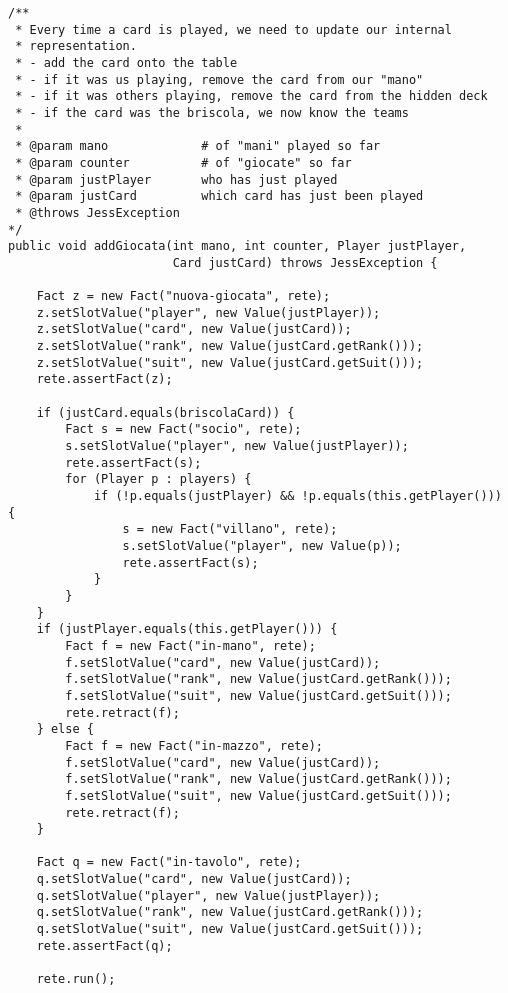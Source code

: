 \lstset{numbers=left, numberstyle=\tiny, stepnumber=1,firstnumber=1,
  numbersep=5pt,language=Java,
stringstyle=\ttfamily,
basicstyle=\footnotesize, 
showstringspaces=false,
breaklines=true
}

\begin{lstlisting}[caption={Funzione che viene richiamata ogni volta che si riceve la comunicazione di una nuova giocata (quindi anche la propria). Vengono aggiornati i fatti riguardanti la giocata stessa, la situazione in tavola e nel mazzo (ovvero nelle mani altrui) ed eventualmente i ruoli}, label=addGiocata]
/**
 * Every time a card is played, we need to update our internal
 * representation.
 * - add the card onto the table
 * - if it was us playing, remove the card from our "mano"
 * - if it was others playing, remove the card from the hidden deck
 * - if the card was the briscola, we now know the teams
 *
 * @param mano             # of "mani" played so far
 * @param counter          # of "giocate" so far
 * @param justPlayer       who has just played
 * @param justCard         which card has just been played
 * @throws JessException   
*/
public void addGiocata(int mano, int counter, Player justPlayer,
                       Card justCard) throws JessException {

    Fact z = new Fact("nuova-giocata", rete);
    z.setSlotValue("player", new Value(justPlayer));
    z.setSlotValue("card", new Value(justCard));
    z.setSlotValue("rank", new Value(justCard.getRank()));
    z.setSlotValue("suit", new Value(justCard.getSuit()));
    rete.assertFact(z);

    if (justCard.equals(briscolaCard)) {
        Fact s = new Fact("socio", rete);
        s.setSlotValue("player", new Value(justPlayer));
        rete.assertFact(s);
        for (Player p : players) {
            if (!p.equals(justPlayer) && !p.equals(this.getPlayer())) {
                s = new Fact("villano", rete);
                s.setSlotValue("player", new Value(p));
                rete.assertFact(s);
            }
        }
    }
    if (justPlayer.equals(this.getPlayer())) {
        Fact f = new Fact("in-mano", rete);
        f.setSlotValue("card", new Value(justCard));
        f.setSlotValue("rank", new Value(justCard.getRank()));
        f.setSlotValue("suit", new Value(justCard.getSuit()));
        rete.retract(f);
    } else {
        Fact f = new Fact("in-mazzo", rete);
        f.setSlotValue("card", new Value(justCard));
        f.setSlotValue("rank", new Value(justCard.getRank()));
        f.setSlotValue("suit", new Value(justCard.getSuit()));
        rete.retract(f);
    }

    Fact q = new Fact("in-tavolo", rete);
    q.setSlotValue("card", new Value(justCard));
    q.setSlotValue("player", new Value(justPlayer));
    q.setSlotValue("rank", new Value(justCard.getRank()));
    q.setSlotValue("suit", new Value(justCard.getSuit()));
    rete.assertFact(q);
    
    rete.run();
\end{lstlisting}

